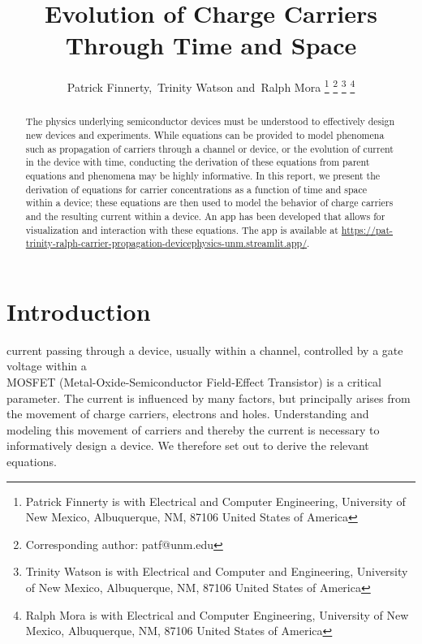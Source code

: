 \documentclass[
  journal,
]{IEEEtran}%
\title{Evolution of Charge Carriers Through Time and Space}
\author{
Patrick Finnerty\orcidlink{0009-0003-4645-6732},~Trinity Watson
and~Ralph Mora%
\thanks{Patrick Finnerty is with Electrical and Computer
Engineering, University of New Mexico, Albuquerque, NM, 87106 United
States of America%
}
\thanks{Corresponding author: patf@unm.edu}
\thanks{Trinity Watson is with Electrical and Computer and
Engineering, University of New Mexico, Albuquerque, NM, 87106 United
States of America%
}
\thanks{Ralph Mora is with Electrical and Computer
Engineering, University of New Mexico, Albuquerque, NM, 87106 United
States of America%
}
}
\begin{document}


\maketitle

\begin{abstract}
The physics underlying semiconductor devices must be understood to
effectively design new devices and experiments. While equations can be
provided to model phenomena such as propagation of carriers through a
channel or device, or the evolution of current in the device with time,
conducting the derivation of these equations from parent equations and
phenomena may be highly informative. In this report, we present the
derivation of equations for carrier concentrations as a function of time
and space within a device; these equations are then used to model the
behavior of charge carriers and the resulting current within a device.
An app has been developed that allows for visualization and interaction
with these equations. The app is available at
\url{https://pat-trinity-ralph-carrier-propagation-devicephysics-unm.streamlit.app/}.
\end{abstract}

%


\section{Introduction}\label{sec-intro}

 current passing through a device, usually within a
channel, controlled by a gate voltage within a\\
MOSFET (Metal-Oxide-Semiconductor Field-Effect Transistor) is a critical
parameter. The current is influenced by many factors, but principally
arises from the movement of charge carriers, electrons and holes.
Understanding and modeling this movement of carriers and thereby the
current is necessary to informatively design a device. We therefore set
out to derive the relevant equations.
\end{document}
